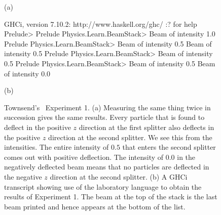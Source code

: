 \documentclass[12pt]{article}
\newcommand{\FunctionTok}[1]{\textcolor[rgb]{0.02,0.16,0.49}{{#1}}}
\newcommand{\darkgreen}[1]{\textcolor[rgb]{0.00,0.80,0.00}{#1}}
\begin{document}
\begin{figure}
  \begin{center}

(a)
  \end{center}
\begin{center}
\begin{Highlighting}[]
GHCi, version 7.10.2: http://www.haskell.org/ghc/  :? for help
Prelude> \color{blue}{:m Physics.Learn.BeamStack}
Prelude Physics.Learn.BeamStack> \color{blue}{randomBeam}
\darkgreen{Beam of intensity 1.0}
Prelude Physics.Learn.BeamStack> \color{blue}{splitZ it}
\darkgreen{Beam of intensity 0.5}
\darkgreen{Beam of intensity 0.5}
Prelude Physics.Learn.BeamStack> \color{blue}{dropBeam it}
\darkgreen{Beam of intensity 0.5}
Prelude Physics.Learn.BeamStack> \color{blue}{splitZ it}
\darkgreen{Beam of intensity 0.5}
\darkgreen{Beam of intensity 0.0}
\end{Highlighting}

(b)
\end{center}
\caption{Townsend's~\cite{townsend} Experiment 1.  (a) Measuring the same thing twice
  in succession gives the same results.  Every particle that is found to deflect
  in the positive $z$ direction at the first splitter also deflects in the
  positive $z$ direction at the second splitter.  We see this from the intensities.
  The entire intensity of $0.5$ that enters the second splitter comes out with
  positive deflection.  The intensity of $0.0$ in the negatively deflected beam
  means that no particles are deflected in the negative $z$ direction at the
  second splitter.
  (b) A GHCi transcript showing use of the laboratory language to obtain the
  results of Experiment 1.  The beam at the top of the stack is the
  last beam printed and hence appears at the bottom of the list.}
\label{townsend1fig}
\end{figure}
\end{document}
